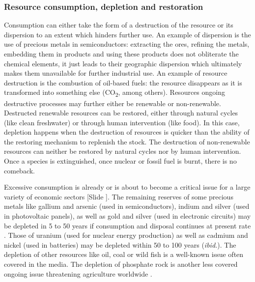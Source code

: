 \documentclass{article}
\newcounter{slide}
\begin{document}
\subsubsection{Resource consumption, depletion and restoration}
\label{sec:depletion}
Consumption can either take the form of a destruction of the resource or its dispersion to an extent which hinders further use. An example of dispersion is the use of precious metals in semiconductors: extracting the ores, refining the metals, embedding them in products and using these products does not obliterate the chemical elements, it just leads to their geographic dispersion which ultimately makes them unavailable for further industrial use. An example of resource destruction is the combustion of oil-based fuels: the resource disappears as it is transformed into something else (CO\textsubscript{2}, among others). Resources ongoing destructive processes may further either be renewable or non-renewable. Destructed renewable resources can be restored, either through natural cycles (like clean freshwater) or through human intervention (like food). In this case, depletion happens when the destruction of resources is quicker than the ability of the restoring mechanism to replenish the stock. The destruction of non-renewable resources can neither be restored by natural cycles nor by human intervention. Once a species is extinguished, once nuclear or fossil fuel is burnt, there is no comeback.

Excessive consumption is already or is about to become a critical issue for a large variety of economic sectors {\color{blue}[Slide ]}. The remaining reserves of some precious metals like gallium and arsenic (used in semiconductors), indium and silver (used in photovoltaic panels), as well as gold and silver (used in electronic circuits) may be depleted in 5 to 50 years if consumption and disposal continues at present rate \cite{dodsonElementalSustainabilityTotal2012}. Those of uranium (used for nuclear energy production) as well as cadmium and nickel (used in batteries) may be depleted within 50 to 100 years (\emph{ibid.}). The depletion of other resources like oil, coal or wild fish is a well-known issue often covered in the media. The depletion of phosphate rock is another less covered ongoing issue threatening agriculture worldwide \cite{cooperFutureDistributionProduction2011}.
\end{document}
